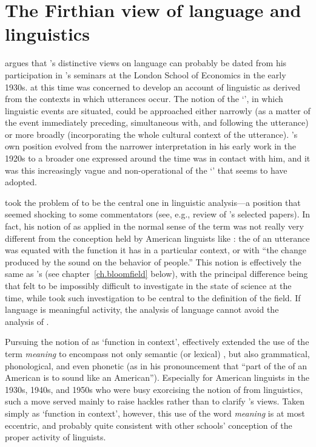 \section{The Firthian view of language and linguistics}

\citet{langendoen68:london.school} argues that {\Firth}'s distinctive
views on language can probably be dated from his participation in
's seminars at the London School of Economics in
the early 1930s. {\Malinowski} at this time was concerned to develop an
account of linguistic  as derived from the contexts in which
utterances occur. The notion of the `', in which
linguistic events are situated, could be approached either narrowly
(as a matter of the event immediately preceding, simultaneous with,
and following the utterance) or more broadly (incorporating the whole
cultural context of the utterance). {\Malinowski}'s own position evolved
from the narrower interpretation in his early work in the 1920s to a
broader one expressed around the time {\Firth} was in contact with him,
and it was this increasingly vague and non-operational  of the
`' that {\Firth} seems to have adopted.

{\Firth} took the problem of  to be the central one in linguistic
analysis—a position that seemed shocking to some commentators (see,
e.g.,  review of {\Firth}'s selected
papers). In fact, his notion of  as applied in the normal sense
of the term was not really very different from the conception held by
American linguists like {\Bloomfield}: the  of an utterance was
equated with the function it has in a particular context, or with ``the
change produced by the sound on the behavior of people.'' This notion
is effectively the same as {\Bloomfield}'s  (see
chapter~\ref{ch.bloomfield} below), with the principal difference
being that {\Bloomfield} felt  to be impossibly difficult to
investigate in the state of science at the time, while {\Firth} took such
investigation to be central to the definition of the field. If
language is meaningful activity, the analysis of language cannot avoid
the analysis of .

Pursuing the notion of  as `function in context', {\Firth}
effectively extended the use of the term \emph{meaning} to encompass
not only semantic (or lexical) , but also grammatical,
phonological, and even phonetic  (as in his pronouncement that
``part of the  of an American is to sound like an
American''). Especially for American linguists in the 1930s, 1940s, and
1950s who were busy exorcising the notion of  from linguistics,
such a move served mainly to raise hackles rather than to clarify
{\Firth}'s views. Taken simply as `function in context', however, this
use of the word \emph{meaning} is at most eccentric, and probably
quite consistent with other schools' conception of the proper activity
of linguists.

